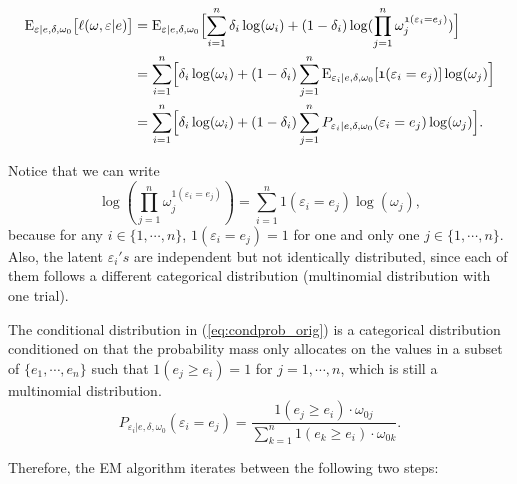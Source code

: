 \documentclass[article]{jss}
\renewcommand{\|}{\,|\,}
\begin{document}
\begin{equation}\label{eq:estep}
\begin{split}
  \textrm{E}_{\varepsilon|e,\delta,\omega_0}\bigl[\ell(\omega,\varepsilon|e)\bigr]
  &= \textrm{E}_{\varepsilon|e,\delta,\omega_0}\Bigl[\sum_{i=1}^n\delta_i\log(\omega_i) +
  (1-\delta_i)\log(\prod_{j=1}^n \omega_j^{\mathfrak 1(\varepsilon_i=e_j)})\Bigr] \\
  &= \sum_{i=1}^n\Bigl[\delta_i\log(\omega_i) +
  (1-\delta_i)\sum_{j=1}^n \textrm{E}_{\varepsilon_i|e,\delta,\omega_0}[\mathfrak1(\varepsilon_i=e_j)]\log(\omega_j)\Bigr] \\
  &= \sum_{i=1}^n\Bigl[\delta_i\log(\omega_i) +
  (1-\delta_i)\sum_{j=1}^n P_{\varepsilon_i|e,\delta,\omega_0}(\varepsilon_i=e_j)\log(\omega_j)\Bigr].
\end{split}
\end{equation}

Notice that we can write
\[
  \log(\prod_{j=1}^n \omega_j^{\mathfrak 1(\varepsilon_i=e_j)}) =
  \sum_{i=1}^n \mathfrak 1(\varepsilon_i=e_j)\log(\omega_j),
\]
because for any \(i \in \{1,\cdots,n\}\), \(\mathfrak 1(\varepsilon_i=e_j)=1\) for one and only one \(j\in\{1,\cdots,n\}\). Also, the latent \(\varepsilon_i's\) are independent but not identically distributed, since each of them follows a different categorical distribution (multinomial distribution with one trial).

The conditional distribution in (\ref{eq:condprob_orig}) is a categorical distribution conditioned on that the probability mass only allocates on the values in a subset of \(\{e_1,\cdots,e_n\}\) such that \(\mathfrak 1(e_j\geq e_i) = 1\) for \(j=1,\cdots,n\), which is still a multinomial distribution.
\begin{equation}\label{eq:condprob_orig}
  P_{\varepsilon_i|e,\delta,\omega_0}(\varepsilon_i=e_j) =
  \frac{\mathfrak 1(e_j\geq e_i)\cdot \omega_{0j}}{\sum_{k=1}^n\mathfrak 1(e_k\geq e_i)\cdot\omega_{0k}}.
\end{equation}

Therefore, the EM algorithm iterates between the following two steps:
\end{document}
